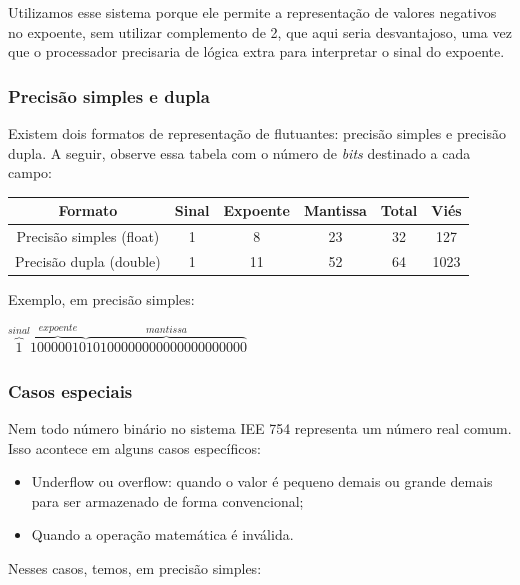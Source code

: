 \documentclass[12pt]{article}
\begin{document}
\noindent
Utilizamos esse sistema porque ele permite a representação de valores negativos no expoente, sem utilizar complemento de 2, que aqui seria desvantajoso, uma vez que o processador precisaria de lógica extra para interpretar o sinal do expoente.

\subsubsection{Precisão simples e dupla}
Existem dois formatos de representação de flutuantes: precisão simples e precisão dupla. A seguir, observe essa tabela com o número de \textit{bits} destinado a cada campo:

\begin{center}
\begin{tabular}{|c|c|c|c|c|c|}
\hline
\textbf{Formato} & \textbf{Sinal} & \textbf{Expoente} & \textbf{Mantissa} & \textbf{Total} & \textbf{Viés} \\
\hline
Precisão simples (float) & 1 & 8 & 23 & 32 & 127 \\
\hline
Precisão dupla (double) & 1 & 11 & 52 & 64 & 1023 \\
\hline
\end{tabular}
\end{center}

\noindent
Exemplo, em precisão simples: 

\begin{center}
\vspace{0.2cm} 
$\overset{sinal}{\overbrace{1}}\overset{expoente}{\overbrace{10000010}}\overset{mantissa}{\overbrace{10100000000000000000000}}$  
\end{center}

\subsubsection{Casos especiais}
Nem todo número binário no sistema IEE 754 representa um número real comum. Isso acontece em alguns casos específicos:

\begin{itemize}
    \item Underflow ou overflow: quando o valor é pequeno demais ou grande demais para ser armazenado de forma convencional;
    \item Quando a operação matemática é inválida.
\end{itemize}

\noindent
Nesses casos, temos, em precisão simples:
\end{document}
